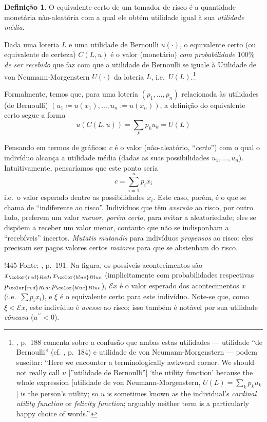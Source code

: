 \documentclass[12pt]{article}
\numberwithin{equation}{section}
\theoremstyle{plain}
\theoremstyle{definition}
\newtheorem{definition}[theorem]{Definição}
\theoremstyle{remark}
\begin{document}
\begin{definition}
O equivalente certo de um tomador de risco é a quantidade monetária
não-aleatória com a qual ele obtém utilidade igual à sua
\textit{utilidade média}.

Dada uma loteria \(L\) e uma utilidade de Bernoulli \(u(\cdot)\), o
equivalente certo (ou equivalente de certeza) \(C(L, u)\) é o valor
(monetário) \textit{com probabilidade \(100\%\) de ser recebido} que faz
com que a utilidade de Bernoulli se iguale à Utilidade de von
Neumann-Morgenstern \(U(\cdot)\) da loteria \(L\),
i.e.~\(U(L)\).\footnote{\textcite{Cowell2004}, p.~188 comenta sobre a
  confusão que ambas estas utilidades --- utilidade ``de Bernoulli''
  (cf. \textcite{Mas-Colell1995}, p.~184) e utilidade de von
  Neumann-Morgenstern --- podem suscitar: ``Here we encounter a
  terminologically awkward corner. We should not really call \(u\)
  {[}''utilidade de Bernoulli''{]} `the utility function' because the
  whole expression {[}utilidade de von Neumann-Morgenstern,
  \(U(L) = \sum \limits_{k} p_{k} u_{k}\){]} is the person's utility; so
  \(u\) is sometimes known as the individual's \textit{cardinal utility
  function} or \textit{felicity function}; arguably neither term is a
  particularly happy choice of words.''.}

Formalmente, temos que, para uma loteria \((p_{1}, \dots, p_{n})\)
relacionada às utilidades (de Bernoulli)
\((u_{1} \coloneqq u(x_{1}), \dots, u_{n}:= u(x_{n}))\), a definição do
equivalente certo segue a forma
\[
u(C(L, u)) = \sum \limits_{k} p_{k} u_{k} = U(L)
\]

Pensando em termos de gráficos: \(c\) é o valor (não-aleatório,
``\textit{certo}'') com o qual o indivíduo alcança a utilidade média
(dadas as suas possibilidades \(u_{1},\dots, u_{n}\)). Intuitivamente,
pensaríamos que este ponto seria
\[
c = \sum \limits_{i=1}^{n} p_{i} x_{i}
\]
i.e.~o valor esperado dentre as possibilidades \(x_{i}\). Este caso,
porém, é o que se chama de ``indiferente ao risco''. Indivíduos que têm
\textit{aversão} ao risco, por outro lado, preferem um valor
\textit{menor, porém certo}, para evitar a aleatoriedade; eles se
dispõem a receber um valor menor, contanto que não se indisponham a
``recebíveis'' incertos. \textit{Mutatis mutandis} para indivíduos
\textit{propensos} ao risco: eles precisam ser pagos valores certos
\textit{maiores} para que se abstenham do risco.

!445 Fonte: \textcite{Cowell2004}, p.~191. Na figura, os possíveis
acontecimentos são \(x_{\color{red} Red}, x_{\color{blue} Blue}\)
(implicitamente com probabilidades respectivas
\(p_{\color{red} Red}, p_{\color{blue} Blue}\)), \(\mathcal{E}x\) é o
valor esperado dos acontecimentos \(x\) (i.e.~\(\sum p_{i}x_{i}\)), e
\(\xi\) é o equivalente certo para este indivíduo. Note-se que, como
\(\xi < \mathcal{E}x\), este indivíduo é \textit{avesso} ao risco; isso
também é notável por sua utilidade \textit{côncava}
(\(u^{\prime\prime}<0\)).
\end{definition}
\end{document}
